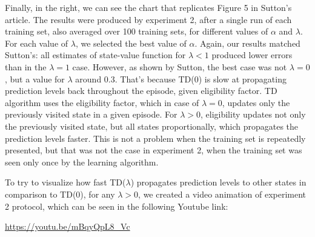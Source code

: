 \documentclass{article}
\begin{document}
Finally, in the right, we can see the chart that replicates Figure 5 in Sutton's article.
The results were produced by experiment 2, after a single run of each training set, also averaged over 100 training sets, for different values of $\alpha$ and $\lambda$.
For each value of $\lambda$, we selected the best value of $\alpha$.
Again, our results matched Sutton's: all estimates of state-value function for $\lambda < 1$ produced lower errors than in the $\lambda = 1$ case.
However, as shown by Sutton, the best case was not $\lambda = 0$, but a value for $\lambda$ around 0.3.
That's because TD(0) is slow at propagating prediction levels back throughout the episode, given eligibility factor.
TD algorithm uses the eligibility factor, which in case of $\lambda = 0$, updates only the previously visited state in a given episode.
For $\lambda > 0$, eligibility updates not only the previously visited state, but all states proportionally, which propagates the prediction levels faster.
This is not a problem when the training set is repeatedly presented, but that was not the case in experiment 2, when the training set was seen only once by the learning algorithm.

To try to visualize how fast TD($\lambda$) propagates prediction levels to other states in comparison to TD(0), for any $\lambda > 0$, we created a video animation of experiment 2 protocol, which can be seen in the following Youtube link:
\begin{center}
    \url{https://youtu.be/mBqyQpL8_Vc}
\end{center}
\end{document}
